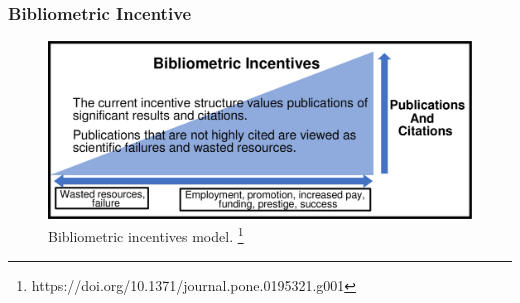 \documentclass{beamer}
\begin{document}
\begin{frame}

    \frametitle{Bibliometric Incentive}

    \begin{figure}[h]
        \includegraphics[height=0.5\textheight]{1.png}
         \caption{Bibliometric incentives model. \footnote{https://doi.org/10.1371/journal.pone.0195321.g001}}
    \end{figure}

\end{frame}
\end{document}
